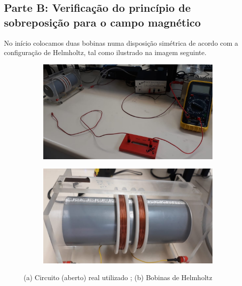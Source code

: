 \subsection*{Parte B: Verificação do princípio de sobreposição para o campo magnético}

\par No início colocamos duas bobinas numa disposição simétrica de acordo com a configuração de Helmholtz, tal como ilustrado na imagem seguinte.


\begin{figure}[H]
		\centering
		\begin{subfigure}[t]{0.45\textwidth}
			\centering
			\includegraphics[scale=0.2]{./circuito_B.jpeg}
			\caption{}
		\end{subfigure}
		\begin{subfigure}[t]{0.45\textwidth}
			\centering
			{\includegraphics[scale=0.2]{./bobinas.jpeg}}
			\caption{}
			\end{subfigure}	
		\caption{(a) Circuito (aberto) real utilizado ; (b) Bobinas de Helmholtz}
	\end{figure}
	

